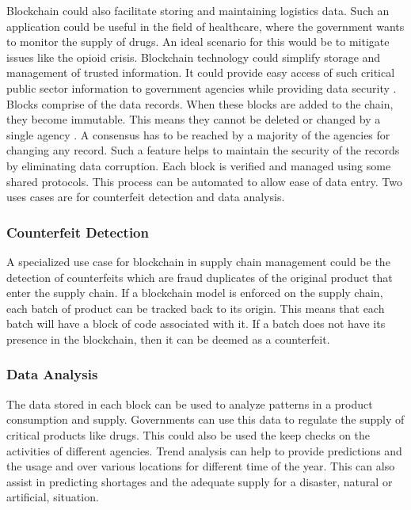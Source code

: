 \documentclass[sigconf]{acmart}
\begin{document}
Blockchain could also facilitate storing and maintaining logistics data. Such an application could be useful in the field of healthcare, where the government wants to monitor the supply of drugs. An ideal scenario for this would be to mitigate issues like the opioid crisis. Blockchain technology could simplify storage and management of trusted information. It could provide easy access of such critical public sector information to government agencies while providing data security \cite{arbc2}. Blocks comprise of the data records. When these blocks are added to the chain, they become immutable. This means they cannot be deleted or changed by a single agency \cite{arbc2}. A consensus has to be reached by a majority of the agencies for changing any record. Such a feature helps to maintain the security of the records by eliminating data corruption. Each block is verified and managed using some shared protocols. This process can be automated to allow ease of data entry. Two uses cases are for counterfeit detection and data analysis.

\subsubsection{Counterfeit Detection} A specialized use case for blockchain in supply chain management could be the detection of counterfeits which are fraud duplicates of the original product that enter the supply chain. If a blockchain model is enforced on the supply chain, each batch of product can be tracked back to its origin. This means that each batch will have a block of code associated with it. If a batch does not have its presence in the blockchain, then it can be deemed as a counterfeit.

\subsubsection{Data Analysis} The data stored in each block can be used to analyze patterns in a product consumption and supply. Governments can use this data to regulate the supply of critical products like drugs. This could also be used the keep checks on the activities of different agencies. Trend analysis can help to provide predictions and the usage and over various locations for different time of the year. This can also assist in predicting shortages and the adequate supply for a disaster, natural or artificial, situation. 
\end{document}

